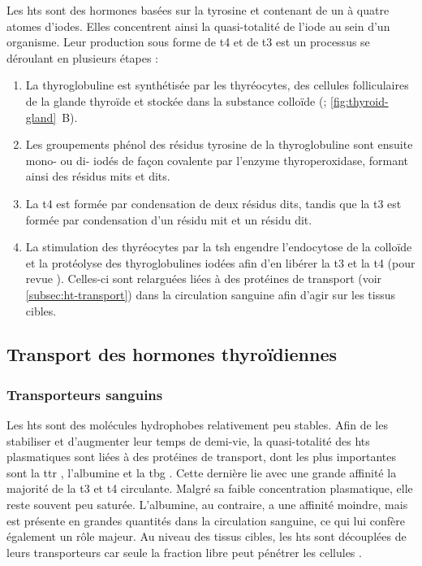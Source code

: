 \documentclass[../main.tex]{subfiles}
\begin{document}
Les \glspl{ht} sont des hormones basées sur la tyrosine et contenant de un à quatre atomes d'iodes.
Elles concentrent ainsi la quasi-totalité de l'iode au sein d'un organisme.
Leur production sous forme de \gls{t4} et de \gls{t3} est un processus se déroulant en plusieurs étapes :
\begin{enumerate}
\item La thyroglobuline est synthétisée par les thyréocytes, des cellules folliculaires de la glande thyroïde et stockée dans la substance colloïde (\citealp{Lissitzky1981}; \autoref{fig:thyroid-gland}~B).
\item Les groupements phénol des résidus tyrosine de la thyroglobuline sont ensuite mono- ou di- iodés de façon covalente par l'enzyme thyroperoxidase, formant ainsi des résidus \glspl{mit} et \glspl{dit}.
\item La \gls{t4} est formée par condensation de deux résidus \glspl{dit}, tandis que la \gls{t3} est formée par condensation d'un résidu \gls{mit} et un résidu \gls{dit}.
\item La stimulation des thyréocytes par la \gls{tsh} engendre l'endocytose de la colloïde et la protéolyse des thyroglobulines iodées afin d'en libérer la \gls{t3} et la \gls{t4} (pour revue \citealp{Rousset2003}).
Celles-ci sont relarguées liées à des protéines de transport (voir \autoref{subsec:ht-transport}) dans la circulation sanguine afin d'agir sur les tissus cibles.
\end{enumerate}


\subsection{Transport des hormones thyroïdiennes}\label{subsec:ht-transport}

\subsubsection{Transporteurs sanguins}
Les \glspl{ht} sont des molécules hydrophobes relativement peu stables.
Afin de les stabiliser et d'augmenter leur temps de demi-vie, la quasi-totalité des \glspl{ht} plasmatiques sont liées à des protéines de transport, dont les plus importantes sont la \gls{ttr} \citep{Palha2002}, l'albumine et la \gls{tbg} \citep{Schussler2000}.
Cette dernière lie avec une grande affinité la majorité de la \gls{t3} et \gls{t4} circulante.
Malgré sa faible concentration plasmatique, elle reste souvent peu saturée.
L'albumine, au contraire, a une affinité moindre, mais est présente en grandes quantités dans la circulation sanguine, ce qui lui confère également un rôle majeur.
Au niveau des tissus cibles, les \glspl{ht} sont découplées de leurs transporteurs car seule la fraction libre peut pénétrer les cellules \citep{Ekins1994}.
\end{document}
